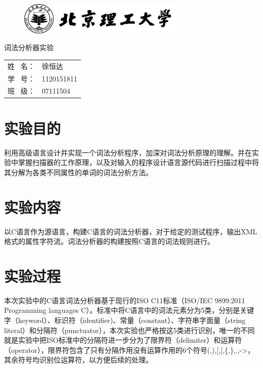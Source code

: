 \documentclass[UTF8, twoside, titlepage]{ctexart}
\begin{document}
\songti
{}

\begin{titlepage}
	\centering
	\vspace*{0.6in}
	\begin{figure}[h]
		\centering
		\includegraphics[width=8cm]{images/bit-logo.png}
	\end{figure}
	\vspace{0.9in}
	{\heiti {} 词法分析器实验}
	\vspace{\fill}
	\begin{table}[h]
		\centering
		\begin{tabular}{rl}
			姓 \ 名： & 徐恒达 \\
			学 \ 号： & 1120151811 \\
			班 \ 级： & 07111504
		\end{tabular}
	\end{table}
	\vspace{0.4in}
\end{titlepage}
\cleardoublepage

\tableofcontents
\cleardoublepage


\section{实验目的}
利用高级语言设计并实现一个词法分析程序，加深对词法分析原理的理解。并在实验中掌握扫描器的工作原理，以及对输入的程序设计语言源代码进行扫描过程中将其分解为各类不同属性的单词的词法分析方法。

\section{实验内容}
以C语言作为源语言，构建C语言的词法分析器，对于给定的测试程序，输出XML格式的属性字符流。词法分析器的构建按照C语言的词法规则进行。

\section{实验过程}
本次实验中的C语言词法分析器基于现行的ISO C11标准（ISO/IEC 9899:2011 Programming languages C）。标准中将C语言中的词法元素分为5类，分别是关键字（keyword）、标识符（identifier)、常量（constant）、字符串字面量（string literal）和分隔符（punctuator），本次实验也严格按这5类进行识别，唯一的不同就是实验中把ISO标准中的分隔符进一步分为了限界符（delimiter）和运算符（operator），限界符包含了只有分隔作用没有运算作用的6个符号(,),[,],\{,\},.,->，其余符号均识别位运算符，以方便后续的处理。
\end{document}
